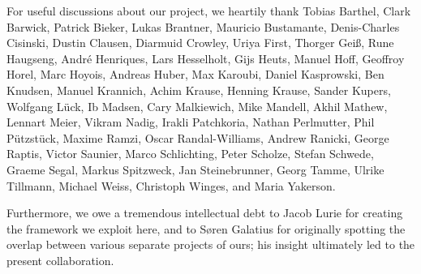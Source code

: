 For useful discussions about our project,
we heartily thank
Tobias Barthel,
Clark Barwick,
Patrick Bieker,
Lukas Brantner,
Mauricio Bustamante,
Denis-Charles Cisinski,
Dustin Clausen,
Diarmuid Crowley,
Uriya First,
Thorger Geiß,
Rune Haugseng,
André Henriques,
Lars Hesselholt,
Gijs Heuts,
Manuel Hoff,
Geoffroy Horel,
Marc Hoyois,
Andreas Huber,
Max Karoubi,
Daniel Kasprowski,
Ben Knudsen,
Manuel Krannich,
Achim Krause,
Henning Krause,
Sander Kupers,
Wolfgang Lück,
Ib Madsen,
Cary Malkiewich,
Mike Mandell,
Akhil Mathew,
Lennart Meier,
Vikram Nadig,
Irakli Patchkoria,
Nathan Perlmutter,
Phil Pützstück,
Maxime Ramzi,
Oscar Randal-Williams,
Andrew Ranicki,
George Raptis,
Victor Saunier,
Marco Schlichting,
Peter Scholze,
Stefan Schwede,
Graeme Segal,
Markus Spitzweck,
Jan Steinebrunner,
Georg Tamme,
Ulrike Tillmann,
Michael Weiss,
Christoph Winges,
and
Maria Yakerson.

Furthermore, we owe a tremendous intellectual debt to Jacob Lurie for creating the framework we exploit here, and to Søren Galatius for originally spotting the overlap between various separate projects of ours; his insight ultimately led to the present collaboration.
